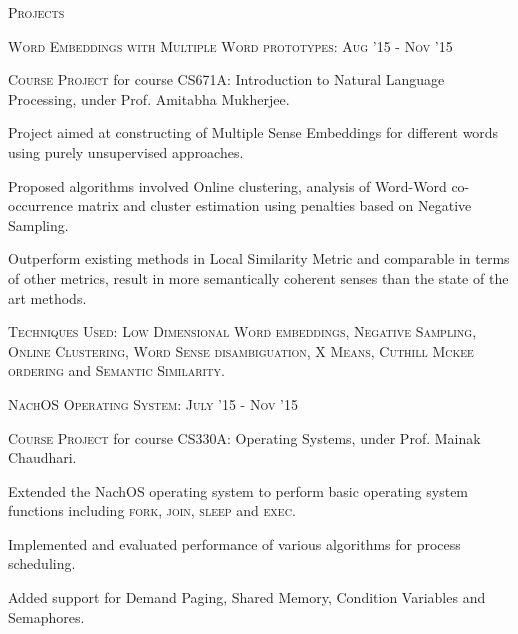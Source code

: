 \documentclass[10pt]{article}
\begin{document}
	\vspace{3mm}

	{\centering\Large{\textsc{Projects}} \hrulefill}
		
	\vspace{3mm}
	
	\large{\textsc{Word Embeddings with Multiple Word prototypes:}}   \hfill \small\textsc{Aug '15 - Nov '15}
	\begin{itemize}
	\small
	{
	\item \textsc{Course Project} for course CS671A: Introduction to Natural Language Processing, under Prof. Amitabha Mukherjee.
	\item Project aimed at constructing of Multiple Sense Embeddings for different words using purely unsupervised approaches.
	\item Proposed algorithms involved Online clustering, analysis of Word-Word co-occurrence matrix and cluster estimation using penalties based on Negative Sampling.
	\item Outperform existing methods in Local Similarity Metric and comparable in terms of other metrics, result in more semantically coherent senses than the state of the art methods.
	\item \textsc{Techniques Used:} \textsc{Low Dimensional Word embeddings, Negative Sampling, Online Clustering, Word Sense disambiguation, X Means, Cuthill Mckee ordering} and \textsc{Semantic Similarity}.
	}
	\end{itemize}
		
	\vspace{2mm}

	\large{\textsc{NachOS Operating System:}}   \hfill \small\textsc{July '15 - Nov '15}
	\begin{itemize}
	\small
	{
	\item \textsc{Course Project} for course CS330A: Operating Systems, under Prof. Mainak Chaudhari.
	\item Extended the NachOS operating system to perform basic operating system functions including \textsc{fork, join, sleep} and \textsc{exec}. 
	\item Implemented and evaluated performance of various algorithms for process scheduling.
	\item Added support for Demand Paging, Shared Memory, Condition Variables and Semaphores.	
	}
	\end{itemize}
		
	\vspace{2mm}
\end{document}
